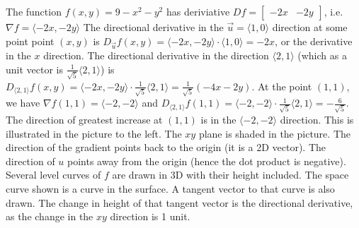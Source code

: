 \begin{example}
The function $f(x,y)=9-x^2-y^2$ has deriviative
$Df=\begin{bmatrix}-2x&-2y\end{bmatrix}$, i.e. $\nabla f = \langle-2x,-2y\rangle$ The
directional derivative in the $\vec u = \langle1,0\rangle$ direction at some point
point $(x,y)$ is $D_{\vec u}f(x,y)=\langle-2x,-2y\rangle\cdot\langle1,0\rangle=-2x$, or the
derivative in the $x$ direction.  The directional derivative in the
direction $\langle2,1\rangle$ (which as a unit vector is
$\frac{1}{\sqrt{5}}\langle2,1\rangle$) is
$D_{\langle2,1\rangle}f(x,y)=\langle-2x,-2y\rangle\cdot\frac{1}{\sqrt{5}}\langle2,1\rangle=\frac{1}{\sqrt{5}}(-4x-2y)$.
At the point $(1,1)$, we have $\nabla f(1,1) = \langle-2,-2\rangle$ and
$D_{\langle2,1\rangle}f(1,1)=\langle-2,-2\rangle\cdot \frac{1}{\sqrt 5}\langle2,1\rangle=-\frac{6}{\sqrt{5}}$.
The direction of greatest increase at $(1,1)$ is in the $\langle-2,-2\rangle$
direction. This is illustrated in the picture to the left. The $xy$
plane is shaded in the picture. The direction of the gradient points
back to the origin (it is a 2D vector).  The direction of $u$ points
away from the origin (hence the dot product is negative). Several
level curves of $f$ are drawn in 3D with their height included.  The
space curve shown is a curve in the surface. A tangent vector to that
curve is also drawn. The change in height of that tangent vector is
the directional derivative, as the change in the $xy$ direction is 1
unit.
\end{example}




